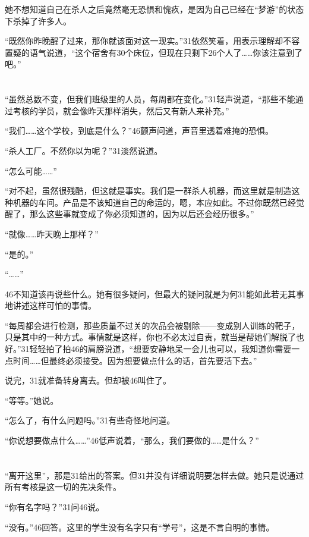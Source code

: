 她不想知道自己在杀人之后竟然毫无恐惧和愧疚，是因为自己已经在“梦游”的状态下杀掉了许多人。

“既然你昨晚醒了过来，那你就该面对这一现实。”31依然笑着，用表示理解却不容置疑的语气说道，“这个宿舍有30个床位，但现在只剩下26个人了……你该注意到了吧。”

\section*{}

“虽然总数不变，但我们班级里的人员，每周都在变化。”31轻声说道，“那些不能通过考核的学员，就会像昨天那样消失，然后又有新人来补充。”

“我们……这个学校，到底是什么？”46颤声问道，声音里透着难掩的恐惧。

“杀人工厂。不然你以为呢？”31淡然说道。

“怎么可能……”

“对不起，虽然很残酷，但这就是事实。我们是一群杀人机器，而这里就是制造这种机器的车间。产品是不该知道自己的命运的，嗯，本应如此。不过你既然已经觉醒了，那么这些事就变成了你必须知道的，因为以后还会经历很多。”

“就像……昨天晚上那样？”

“是的。”

“……”

46不知道该再说些什么。她有很多疑问，但最大的疑问就是为何31能如此若无其事地讲述这样可怕的事情。

“每周都会进行检测，那些质量不过关的次品会被剔除——变成别人训练的靶子，只是其中的一种方式。事情就是这样，你也不必太过自责，就当是帮她们解脱了也好。”31轻轻拍了拍46的肩膀说道，“想要安静地呆一会儿也可以，我知道你需要一点时间……但最终必须接受。因为想要做点什么的话，首先要活下去。”

说完，31就准备转身离去。但却被46叫住了。

“等等。”她说。

“怎么了，有什么问题吗。”31有些奇怪地问道。

“你说想要做点什么……”46低声说着，“那么，我们要做的……是什么？”

\section*{}

“离开这里”，那是31给出的答案。但31并没有详细说明要怎样去做。她只是说通过所有考核是这一切的先决条件。

“你有名字吗？”31问46说。

“没有。”46回答。这里的学生没有名字只有“学号”，这是不言自明的事情。

